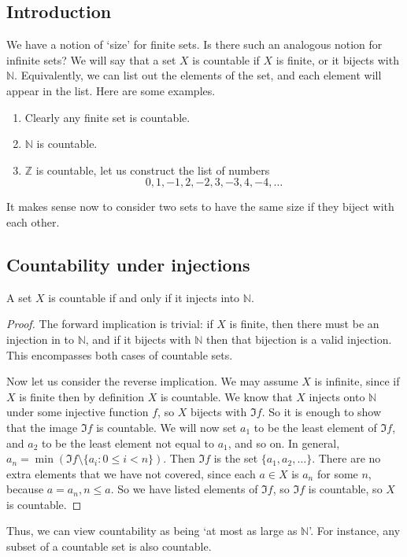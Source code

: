 \subsection{Introduction}
We have a notion of `size' for finite sets.
Is there such an analogous notion for infinite sets?
We will say that a set \(X\) is countable if \(X\) is finite, or it bijects with \(\mathbb N\).
Equivalently, we can list out the elements of the set, and each element will appear in the list.
Here are some examples.
\begin{enumerate}
	\item Clearly any finite set is countable.
	\item \(\mathbb N\) is countable.
	\item \(\mathbb Z\) is countable, let us construct the list of numbers
	      \[
		      0, 1, -1, 2, -2, 3, -3, 4, -4, \dots
	      \]
\end{enumerate}
It makes sense now to consider two sets to have the same size if they biject with each other.

\subsection{Countability under injections}
\begin{proposition}
	A set \(X\) is countable if and only if it injects into \(\mathbb N\).
\end{proposition}
\begin{proof}
	The forward implication is trivial: if \(X\) is finite, then there must be an injection in to \(\mathbb N\), and if it bijects with \(\mathbb N\) then that bijection is a valid injection.
	This encompasses both cases of countable sets.

	Now let us consider the reverse implication.
	We may assume \(X\) is infinite, since if \(X\) is finite then by definition \(X\) is countable.
	We know that \(X\) injects onto \(\mathbb N\) under some injective function \(f\), so \(X\) bijects with \(\Im f\).
	So it is enough to show that the image \(\Im f\) is countable.
	We will now set \(a_1\) to be the least element of \(\Im f\), and \(a_2\) to be the least element not equal to \(a_1\), and so on.
	In general, \(a_n = \min (\Im f \setminus \{ a_i : 0 \leq i < n \})\).
	Then \(\Im f\) is the set \(\{ a_1, a_2, \dots \}\).
	There are no extra elements that we have not covered, since each \(a \in X\) is \(a_n\) for some \(n\), because \(a=a_n, n \leq a\).
	So we have listed elements of \(\Im f\), so \(\Im f\) is countable, so \(X\) is countable.
\end{proof}
Thus, we can view countability as being `at most as large as \(\mathbb N\)'.
For instance, any subset of a countable set is also countable.

